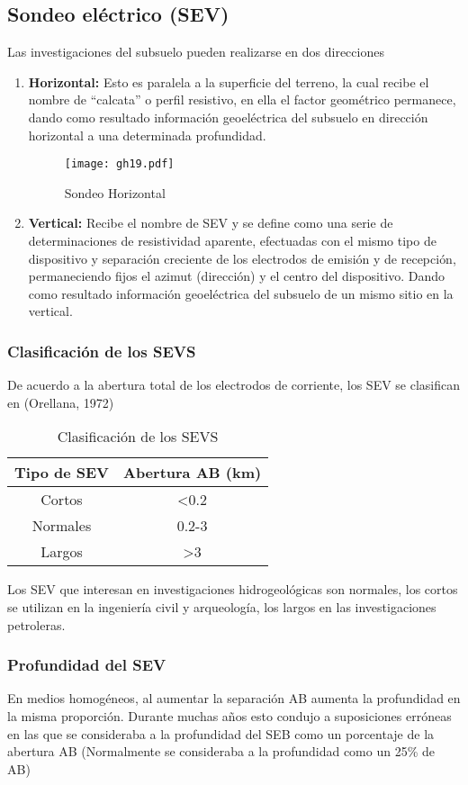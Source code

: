 \subsection{Sondeo eléctrico (SEV)}
Las investigaciones del subsuelo pueden realizarse en dos direcciones
\begin{enumerate}
    \item \textbf{Horizontal:} Esto es paralela a la superficie del terreno, la cual recibe el nombre de ``calcata'' o perfil resistivo, en ella el factor geométrico permanece, 
    dando como resultado información geoeléctrica del subsuelo en dirección horizontal a una determinada profundidad.
    \begin{figure}[h!]
        \centering
        \texttt{[image: gh19.pdf]}
        \caption{Sondeo Horizontal}
        \label{gh19}
    \end{figure}
    \item \textbf{Vertical:} Recibe el nombre de SEV y se define como una serie de determinaciones de resistividad aparente, efectuadas con el mismo tipo de dispositivo y separación creciente de los electrodos de emisión y de recepción, permaneciendo fijos el azimut (dirección) y el centro del dispositivo. Dando como resultado información geoeléctrica del subsuelo de un mismo sitio en la vertical.
\end{enumerate}
\subsubsection{Clasificación de los SEVS}
De acuerdo a la abertura total de los electrodos de corriente, los SEV se clasifican en (Orellana, 1972)
\begin{table}[h!]
    \centering
    \begin{tabular}{@{}cc@{}}
    \toprule
    Tipo de SEV & Abertura AB (km) \\ \midrule
    Cortos      & \textless{}0.2   \\
    Normales    & 0.2-3            \\
    Largos      & \textgreater{}3  \\ \bottomrule
    \end{tabular}
    \caption{Clasificación de los SEVS}
    \label{tabgh7}
\end{table}
Los SEV que interesan en investigaciones hidrogeológicas son normales, los cortos se utilizan en la ingeniería civil y arqueología, los largos en las investigaciones petroleras.
\subsubsection{Profundidad del SEV}
En medios homogéneos, al aumentar la separación AB aumenta la profundidad en la misma proporción. Durante muchas años esto condujo a suposiciones erróneas en las que se consideraba a la profundidad del SEB como un porcentaje de la abertura AB (Normalmente se consideraba a la profundidad como un 25\% de AB)

